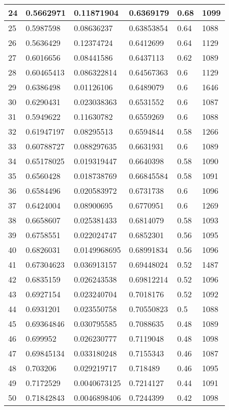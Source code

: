 \begin{longtable}{|l|l|l|l|l|l|}
24 & 0.5662971 & 0.11871904 & 0.6369179 & 0.68 & 1099 \\ \hline 
25 & 0.5987598 & 0.08636237 & 0.63853854 & 0.64 & 1088 \\ \hline 
26 & 0.5636429 & 0.12374724 & 0.6412699 & 0.64 & 1129 \\ \hline 
27 & 0.6016656 & 0.08441586 & 0.6437113 & 0.62 & 1089 \\ \hline 
28 & 0.60465413 & 0.086322814 & 0.64567363 & 0.6 & 1129 \\ \hline 
29 & 0.6386498 & 0.01126106 & 0.6489079 & 0.6 & 1646 \\ \hline 
30 & 0.6290431 & 0.023038363 & 0.6531552 & 0.6 & 1087 \\ \hline 
31 & 0.5949622 & 0.11630782 & 0.6559269 & 0.6 & 1088 \\ \hline 
32 & 0.61947197 & 0.08295513 & 0.6594844 & 0.58 & 1266 \\ \hline 
33 & 0.60788727 & 0.088297635 & 0.6631931 & 0.6 & 1089 \\ \hline 
34 & 0.65178025 & 0.019319447 & 0.6640398 & 0.58 & 1090 \\ \hline 
35 & 0.6560428 & 0.018738769 & 0.66845584 & 0.58 & 1091 \\ \hline 
36 & 0.6584496 & 0.020583972 & 0.6731738 & 0.6 & 1096 \\ \hline 
37 & 0.6424004 & 0.08900695 & 0.6770951 & 0.6 & 1269 \\ \hline 
38 & 0.6658607 & 0.025381433 & 0.6814079 & 0.58 & 1093 \\ \hline 
39 & 0.6758551 & 0.022024747 & 0.6852301 & 0.56 & 1095 \\ \hline 
40 & 0.6826031 & 0.0149968695 & 0.68991834 & 0.56 & 1096 \\ \hline 
41 & 0.67304623 & 0.036913157 & 0.69448024 & 0.52 & 1487 \\ \hline 
42 & 0.6835159 & 0.026243538 & 0.69812214 & 0.52 & 1096 \\ \hline 
43 & 0.6927154 & 0.023240704 & 0.7018176 & 0.52 & 1092 \\ \hline 
44 & 0.6931201 & 0.023550758 & 0.70550823 & 0.5 & 1088 \\ \hline 
45 & 0.69364846 & 0.030795585 & 0.7088635 & 0.48 & 1089 \\ \hline 
46 & 0.699952 & 0.026230777 & 0.7119048 & 0.48 & 1098 \\ \hline 
47 & 0.69845134 & 0.033180248 & 0.7155343 & 0.46 & 1087 \\ \hline 
48 & 0.703206 & 0.029219717 & 0.718489 & 0.46 & 1095 \\ \hline 
49 & 0.7172529 & 0.0040673125 & 0.7214127 & 0.44 & 1091 \\ \hline 
50 & 0.71842843 & 0.0046898406 & 0.7244399 & 0.42 & 1098 \\ \hline 
\end{longtable}
